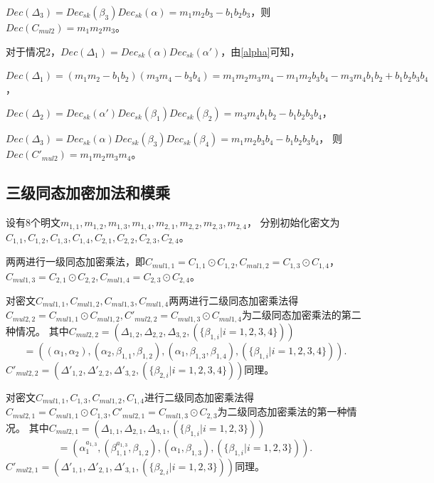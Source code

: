\documentclass[12pt, a4paper, oneside]{ctexart}
\begin{document}
$Dec(\Delta_3) = Dec_{sk}(\beta_3)Dec_{sk}(\alpha) =m_1m_2b_3-b_1b_2b_3 $，则$Dec(C_{mul2}) = m_1m_2m_3$。

对于情况2，$Dec(\Delta_1) = Dec_{sk}(\alpha)Dec_{sk}(\alpha') $，由\ref{alpha}可知，

$Dec(\Delta_1) = (m_1m_2-b_1b_2)(m_3m_4-b_3b_4)=m_1m_2m_3m_4-m_1m_2b_3b_4-m_3m_4b_1b_2+b_1b_2b_3b_4$，

$Dec(\Delta_2) = Dec_{sk}(\alpha')Dec_{sk}(\beta_1)Dec_{sk}(\beta_2) =m_3m_4b_1b_2-b_1b_2b_3b_4 $，

$Dec(\Delta_3) = Dec_{sk}(\alpha)Dec_{sk}(\beta_3)Dec_{sk}(\beta_4) =m_1m_2b_3b_4-b_1b_2b_3b_4 $，
则$Dec(C'_{mul2}) = m_1m_2m_3m_4$。

\subsection{三级同态加密加法和模乘}

设有8个明文$m_{1,1},m_{1,2},m_{1,3},m_{1,4},m_{2,1},m_{2,2},m_{2,3},m_{2,4}$，
分别初始化密文为$C_{1,1},C_{1,2},C_{1,3},C_{1,4},C_{2,1},C_{2,2},C_{2,3},C_{2,4}$。

两两进行一级同态加密乘法，即$C_{mul1,1} = C_{1,1}\odot C_{1,2},C_{mul1,2} = C_{1,3}\odot C_{1,4}$，
$C_{mul1,3} = C_{2,1}\odot C_{2,2},C_{mul1,4} = C_{2,3}\odot C_{2,4}$。

对密文$C_{mul1,1},C_{mul1,2},C_{mul1,3},C_{mul1,4}$两两进行二级同态加密乘法得
$C_{mul2,2} = C_{mul1,1}\odot C_{mul1,2},C'_{mul2,2} = C_{mul1,3}\odot C_{mul1,4}$为二级同态加密乘法的第二种情况。
其中$C_{mul2,2} = (\Delta_{1,2},\Delta_{2,2},\Delta_{3,2},( \{\beta_{1,i}|i=1,2,3,4\}))$
$$ = ((\alpha_1,\alpha_2),(\alpha_2,\beta_{1,1},\beta_{1,2}),(\alpha_1,\beta_{1,3},\beta_{1,4}) ,(\{\beta_{1,i}|i=1,2,3,4\})).$$
$C'_{mul2,2} = (\Delta'_{1,2},\Delta'_{2,2},\Delta'_{3,2},(\{\beta_{2,i}|i=1,2,3,4\}))$同理。

对密文$C_{mul1,1},C_{1,3},C_{mul1,2},C_{1,4}$进行二级同态加密乘法得
$C_{mul2,1} = C_{mul1,1}\odot C_{1,3},C'_{mul2,1} = C_{mul1,3}\odot C_{2,3}$为二级同态加密乘法的第一种情况。
其中$C_{mul2,1} = (\Delta_{1,1},\Delta_{2,1},\Delta_{3,1},(\{\beta_{1,i}|i=1,2,3\}))$
$$ =(\alpha_1^{a_{1,3}},(\beta_{1,1}^{a_{1,3}},\beta_{1,2}),(\alpha_1,\beta_{1,3}) ,(\{\beta_{1,i}|i=1,2,3\})) .$$
$C'_{mul2,1} = (\Delta'_{1,1},\Delta'_{2,1},\Delta'_{3,1},(\{\beta_{2,i}|i=1,2,3\}))$同理。
\end{document}
